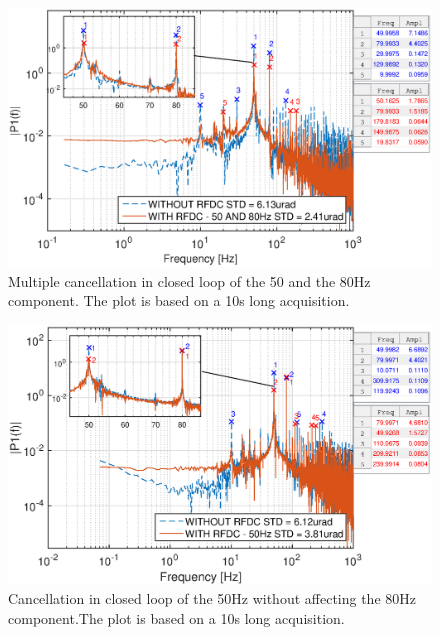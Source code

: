 \begin{figure}[h]
  \centering %
  \includegraphics[width=1\textwidth]{fig/matlab/mult_50_80_closed_loop}
  \caption{\label{fig:mult5080} Multiple cancellation in closed loop of the 50 and the 80Hz component. The plot is based on a 10s long acquisition.}
\end{figure}

\begin{figure}[h]
  \centering %
  \includegraphics[width=1\textwidth]{fig/matlab/mult_50_selected_closed_loop}
  \caption{\label{fig:mult50no80} Cancellation in closed loop of the 50Hz without affecting the 80Hz component.The plot is based on a 10s long acquisition.}
\end{figure}

\FloatBarrier
